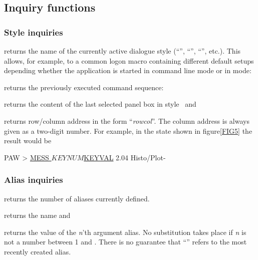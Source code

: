 \subsection{Inquiry functions}


\subsubsection{Style inquiries}

\begin{UL}

\item{}
returns the name of the currently active dialogue
style (``'', ``'', ``'', etc.).
This allows, for example, to a common logon macro containing different
default setups depending whether the application is started in command
line mode or in \Motif{} mode:

\item{}
returns the previously executed command sequence:

\item{}
returns the content of the last selected panel box in
style~ and 
\item{} returns row/column address in
the form ``\textsl{rowcol}''.
The column address is always given as a two-digit number.
\ifKUIPman
For example, in the state shown in figure\ref{FIG5} the result would
be
\begin{XMP}
PAW > \underline{MESS $KEYNUM $KEYVAL}
 2.04 Histo/Plot-
\vspace{-1cm}
\end{XMP}
\fi
\end{UL}

\subsubsection{Alias inquiries}

\begin{UL}

\item{} 
returns the number of  aliases
currently defined. 

\item{} 
returns the name and
\item{} returns the value of the \textsl{n}'th
argument alias.
No substitution takes place if \textsl{n} is not a number between 1
and .
There is no guarantee that ``'' refers to the
most recently created alias.

\end{UL}

